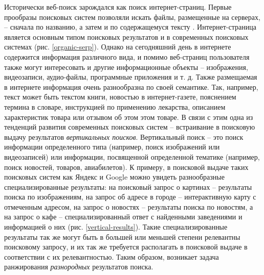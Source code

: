 \documentclass[12pt,a4paper]{report}
\newcommand\figref[1]{(рис. \ref{#1})}
\newcommand\note[1]{\textcolor{red}{(#1)}}
\newcommand\todonote[1]{\note{TODO: #1}}
\begin{document}
Исторически веб-поиск зарождался как поиск интернет-страниц. Первые прообразы поисковых систем позволяли искать файлы, размещенные на серверах, -- сначала по названию, а затем и по содержащемуся тексту \cite{SearchHistory}. Интернет-страница является основным типом поисковых результатов и в современных поисковых системах \figref{organic-serp}. 
Однако на сегодняшний день в интернете содержится информация различного вида, и помимо веб-страниц пользователя также могут интересовать и другие информационные объекты -- изображения, видеозаписи, аудио-файлы, программные приложения и т. д. Также размещаемая в интернете информация очень разнообразна по своей семантике. Так, например, текст может быть текстом книги, новостью в интернет-газете, пояснением термина в словаре, инструкцией по применению лекарства, описанием характеристик товара или отзывом об этом этом товаре. В связи с этим одна из тенденций развития современных поисковых систем -- встраивание в поисковую выдачу результатов \emph{вертикальных поисков}. Вертикальный поиск -- это поиск информации определенного типа (например, поиск изображений или видеозаписей) или информации, посвященной определенной тематике (например, поиск новостей, товаров, авиабилетов). 
К примеру, в поисковой выдаче таких поисковых систем как Яндекс и Google можно увидеть разнообразные специализированные результаты: на поисковый запрос о картинах -- результаты поиска по изображениям, на запрос об адресе в городе --  интерактивную карту с отмеченным адресом, на запрос о новостях -- результаты поиска по новостям, а на запрос о кафе -- специализированный ответ с найденными заведениями и информацией о них \figref{vertical-results}.
Такие специализированные результаты так же могут быть в большей или меньшей степени релевантны поисковому запросу, и их так же требуется располагать в поисковой выдаче в соответствии с их релевантностью. Таким образом, возникает задача ранжирования \emph{разнородных} результатов поиска.
\end{document}
